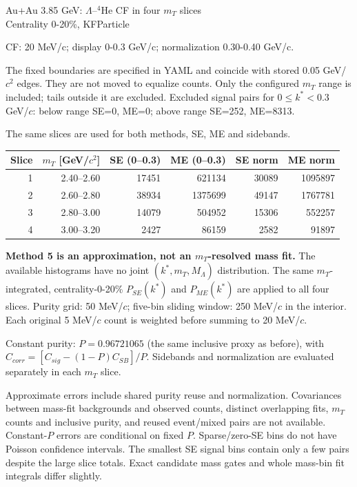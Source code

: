 \documentclass[10pt,a4paper]{article}
\begin{document}
\begin{center}\Large Au+Au 3.85 GeV: $\Lambda$--$^4$He CF in four $m_T$ slices\\
\large Centrality 0-20\%, KFParticle\end{center}
\noindent CF: 20 MeV/c; display 0-0.3 GeV/c; normalization 0.30-0.40 GeV/c.

\medskip
\noindent The fixed boundaries are specified in YAML and coincide with stored
0.05 GeV/$c^2$ edges. They are not moved to equalize counts.
Only the configured $m_T$ range is included; tails outside it are excluded.
Excluded signal pairs for $0\leq k^*<0.3$ GeV/$c$: below range SE=0, ME=0; above range SE=252, ME=8313.

The same slices are used for both methods, SE, ME and sidebands.

\begin{center}\small\begin{tabular}{rrrrrr}\toprule
Slice & $m_T$ [GeV/$c^2$] & SE (0--0.3) & ME (0--0.3) & SE norm & ME norm\\\midrule
1 & 2.40–2.60 & 17451 & 621134 & 30089 & 1095897 \\
2 & 2.60–2.80 & 38934 & 1375699 & 49147 & 1767781 \\
3 & 2.80–3.00 & 14079 & 504952 & 15306 & 552257 \\
4 & 3.00–3.20 & 2427 & 86159 & 2582 & 91897 \\
\bottomrule\end{tabular}\end{center}

\noindent\textbf{Method 5 is an approximation, not an $m_T$-resolved mass fit.}
The available histograms have no joint $(k^*,m_T,M_\Lambda)$ distribution.
The same $m_T$-integrated, centrality-0-20\% $P_{SE}(k^*)$ and $P_{ME}(k^*)$
are applied to all four slices. Purity grid: 50 MeV/$c$;
five-bin sliding window: 250 MeV/$c$ in the interior.
Each original 5 MeV/$c$ count is weighted before summing to 20 MeV/$c$.

\medskip
\noindent Constant purity: $P=0.96721065$ (the same inclusive proxy as before),
with $C_{corr}=[C_{sig}-(1-P)C_{SB}]/P$. Sidebands and normalization
are evaluated separately in each $m_T$ slice.

\medskip
\noindent Approximate errors include shared purity reuse and normalization.
Covariances between mass-fit backgrounds and observed counts, distinct overlapping
fits, $m_T$ counts and inclusive purity, and reused event/mixed pairs are not available.
Constant-$P$ errors are conditional on fixed $P$.
Sparse/zero-SE bins do not have Poisson confidence intervals.
The smallest SE signal bins contain only a few pairs despite the large slice totals.
Exact candidate mass gates and whole mass-bin fit integrals differ slightly.
\end{document}
